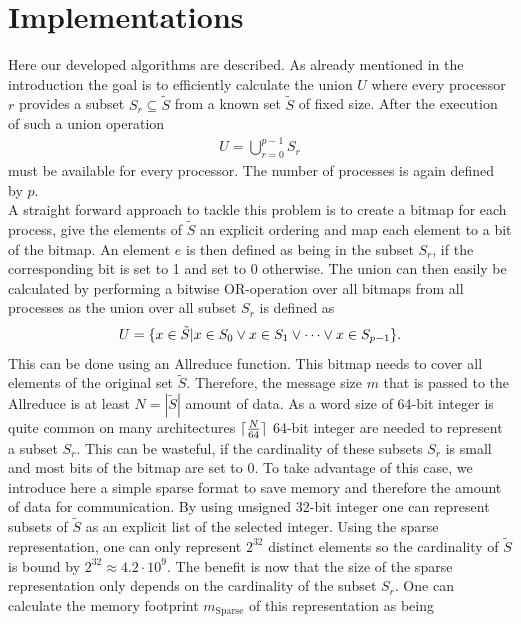
\chapter{Implementations} \label{chap:Implementations}
Here our developed algorithms are described. As already mentioned in the introduction the goal is to efficiently calculate the union $U$
where every processor $r$  provides a subset $S_r\subseteq \tilde{S}$ from a known set $\tilde{S}$ of fixed size. After the execution of such a union operation
\begin{align*}
	U = \bigcup_{r=0}^{p-1} S_r
\end{align*}
must be available for every processor. The number of processes is again defined by $p$. \\
A straight forward approach to tackle this problem is to create a bitmap for each process, give the elements of $\tilde{S}$ an explicit ordering
and map each element to a bit of the bitmap. An element $e$ is then defined as being in the subset $S_r$, if the corresponding 
bit is set to 1 and set to 0 otherwise. The union can then easily be calculated by performing a bitwise OR-operation over all 
bitmaps from all processes as the union over all subset $S_r$ is defined as
\begin{align*}
	U = \{x \in \Tilde{S} | x \in S_0 \lor x \in S_1 \lor \cdots \lor x \in S_{p-1} \}.
\end{align*}
This can be done using an Allreduce function. This bitmap needs to cover all elements of the original set $\tilde{S}$. Therefore, the message size $m$ that is passed to the Allreduce is at least $N=|\tilde{S}|$ amount of data. As a word size of 64-bit integer is quite common on many architectures $\lceil\frac{N}{64}\rceil$ 64-bit integer are needed to represent a subset $S_r$. This can be wasteful, if the cardinality of these subsets $S_r$ is small and most bits of the bitmap are set to 0. To take advantage of this case, we introduce here a simple sparse format to save memory and therefore the amount of data for communication. By using unsigned 32-bit integer one can represent subsets of $\tilde{S}$ as an explicit list of the selected integer. Using the sparse representation, one can only represent $2^{32}$ distinct elements so the cardinality of $\tilde{S}$ is bound by $2^{32} \approx 4.2\cdot10^9$. The benefit is now that the size of the sparse representation only depends on the cardinality of the subset $S_r$. One can calculate the memory footprint $m_\mathrm{Sparse}$ of this representation as being 

